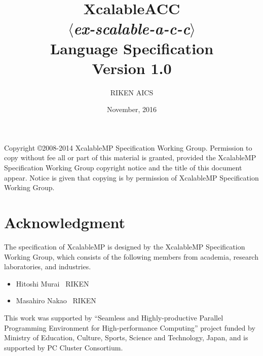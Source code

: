 \documentclass[a4paper,11pt,twoside]{report}
\title{{\Huge XcalableACC}\\
$\langle${\it ex-scalable-a-c-c}$\rangle$\\
Language Specification\\
\vspace{2cm}
Version 1.0\\}
\author{
\Large RIKEN AICS\\
}
\date{\vspace{4cm}\Large November, 2016}
\def\XMP{XcalableMP}
\begin{document}
\maketitle

Copyright \copyright 2008-2014 {\XMP} Specification Working Group.
Permission to copy without fee all or part of this material is granted,
provided the {\XMP} Specification Working Group copyright notice and the
title of this document appear. Notice is given that copying is by permission
of {\XMP} Specification Working Group.

% 

\tableofcontents
\listoffigures
\listoftables

\chapter*{Acknowledgment}

The specification of {\XMP} is designed by the {\XMP} Specification
Working Group, which consists of the following members from academia,
research laboratories, and industries.

\begin{itemize}
\setlength{\itemsep}{-1mm}
\item Hitoshi Murai      \dotfill \ RIKEN
\item Masahiro Nakao     \dotfill \ RIKEN
\end{itemize}

This work was supported by ``Seamless and Highly-productive Parallel
Programming Environment for High-performance Computing'' project funded
by Ministry of Education, Culture, Sports, Science and Technology,
Japan, and is supported by PC Cluster Consortium.

\newpage
\mbox{}\newpage

\pagestyle{fancy}
\fancyhead{} %
\fancyhead[RE]{\leftmark}
\fancyhead[LO]{\rightmark}
\fancyhead[LE,RO]{\thepage}
\fancyfoot{} %
\renewcommand{\headrulewidth}{0pt}
\renewcommand{\footrulewidth}{0pt}


\cleardoublepage


%
\cleardoublepage






% 
% 
% 
% 
\end{document}

